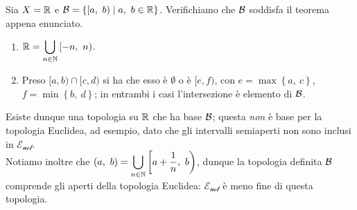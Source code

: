 \begin{example}
	Sia $X=\mathbb{R}$ e $\basis=\left\{[a,\ b)\mid a,\ b\in\realset\right\}$. Verifichiamo che $\mathcal{B}$ soddisfa il teorema appena enunciato.
	\begin{enumerate}
		\item $\displaystyle\mathbb{R}=\mathop{{\bigcup}}\displaylimits_{n\in \mathbb{N}}\left[-n,\ n\right)$.
		\item Preso $[a, b)\cap[c, d)$ si ha che esso è $\emptyset$ o è $[e, f)$, con $e=\max\left\{a,\ c\right\}$, $f=\min\left\{b,\ d\right\}$; in entrambi i casi l'intersezione è elemento di $\mathcal{B}$.
	\end{enumerate}
	Esiste dunque una topologia su $\mathbb{R}$ che ha base $\mathcal{B}$; questa \textit{non} è base per la topologia Euclidea, ad esempio, dato che gli intervalli semiaperti non sono inclusi in $\mathcal{E_{ucl}}$.\\
	Notiamo inoltre che $\displaystyle\left(a,\ b\right)=\union_{n\in \naturalset}\left[a+\frac{1}{n},\ b\right)$, dunque la topologia definita $\mathcal{B}$ comprende gli aperti della topologia Euclidea: $\mathcal{E_{ucl}}$ è meno fine di questa topologia.
\end{example}
